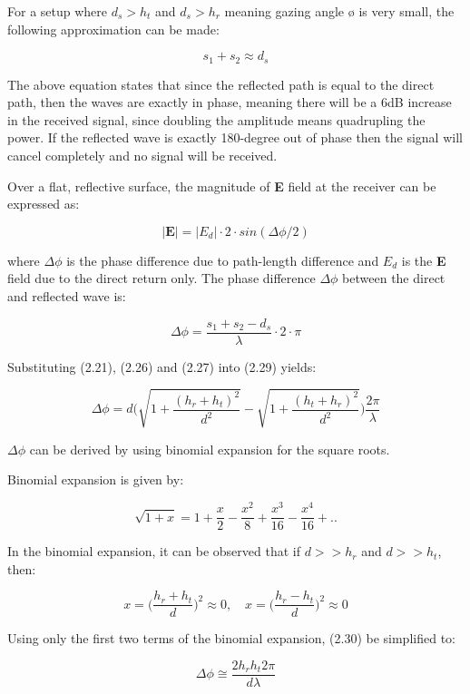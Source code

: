 For a setup where $d_s > h_t$ and $d_s > h_r$ meaning gazing angle $ø$ is very small, the following approximation can be made:

$$s_1 + s_2 \approx d_s$$

The above equation states that since the reflected path is equal to the direct path, then the waves are exactly in phase, meaning there will be a 6dB increase in the received signal, since doubling the amplitude means quadrupling the power. If the reflected wave is exactly 180-degree out of phase then the signal will cancel completely and no signal will be received.

Over a flat, reflective surface, the magnitude of \textbf{E} field at the receiver can be expressed as: 

\begin{equation}
  |\textbf{E}| = |E_d| \cdot 2 \cdot sin(\Delta\phi/2)
\end{equation}

where $\Delta\phi$ is the phase difference due to path-length difference and $E_d$ is the \textbf{E} field due to the direct return only. The phase difference $\Delta\phi$ between the direct and reflected wave is:

\begin{equation}
  \Delta\phi = \frac{s_1 +s_2 - d_s}{\lambda} \cdot 2 \cdot \pi
\end{equation}

Substituting (2.21), (2.26) and (2.27) into (2.29) yields:

\begin{equation}
  \Delta\phi = d\Bigg( \sqrt{1+ \frac{(h_r+h_t)^2}{d^2}} - \sqrt{1+ \frac{(h_t+h_r)^2}{d^2}} \Bigg) \frac{2\pi}{\lambda}
\end{equation}

$\Delta\phi$ can be derived by using binomial expansion for the square roots.

Binomial expansion is given by: 

$$\sqrt{1+x} = 1+\frac{x}{2}-\frac{x^2}{8}+\frac{x^3}{16}-\frac{x^4}{16}+..$$

In the binomial expansion, it can be observed that if $d>>h_r$ and $d>>h_t$, then:

$$x=\Big(\frac{h_r+h_t}{d}\Big)^2 \approx 0 , \quad x=\Big(\frac{h_r-h_t}{d}\Big)^2 \approx 0$$

Using only the first two terms of the binomial expansion, (2.30) be simplified to:

\begin{equation}
  \Delta\phi\cong \frac{2h_rh_t2\pi}{d\lambda}
\end{equation}

